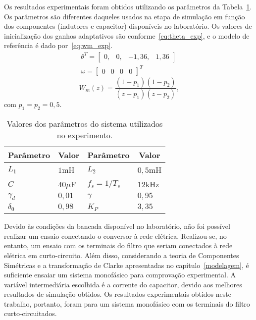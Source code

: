   Os resultados experimentais foram obtidos utilizando os parâmetros da Tabela~\ref{tab:parametros_experimento}. Os parâmetros são diferentes daqueles usados na etapa de simulação em função dos componentes (indutores e capacitor) disponíveis no laboratório. Os valores de inicialização dos ganhos adaptativos são conforme~\ref{eq:theta_exp}, e o modelo de referência é dado por~\ref{eq:wm_exp}.
  \begin{equation}
    \begin{split}
      \theta^T = \left[ \begin{matrix} 0, & 0, & -1,36, & 1,36 \end{matrix} \right]\\
      \omega = {\left[ \begin{matrix} 0 & 0 & 0 & 0 \end{matrix} \right]}^T
    \end{split}
    \label{eq:theta_exp}
  \end{equation}
  \begin{equation}
    W_m(z) = \frac{(1-p_1)(1-p_2)}{(z-p_1)(z-p_2)}\text{,}
    \label{eq:wm_exp}
  \end{equation}
  com $p_1 = p_2 = 0,5$.

  \begin{table}[htb]
    \renewcommand{\arraystretch}{1.35}
    \setlength{\tabcolsep}{1.2mm}
    \caption{Valores dos parâmetros do sistema utilizados no experimento.}
    \label{tab:parametros_experimento}
    \centering
    \begin{tabular}{l l l l}
      \hline
      \multicolumn{1}{c}{Parâmetro} & \multicolumn{1}{c}{Valor} &
      \multicolumn{1}{c}{Parâmetro} & \multicolumn{1}{c}{Valor} \\
      \hline
      $L_1$      & $1$mH    & $L_2$         & $0,5$mH \\
      $C$        & $40\mu$F & $f_s = 1/T_s$ & $12$kHz \\
      $\gamma_d$ & $0,01$   & $\gamma$      & $0,95$  \\
      $\delta_0$ & $0,98$   & $K_P$         & $3,35$  \\
      \hline
    \end{tabular}
  \end{table}

  Devido às condições da bancada disponível no laboratório, não foi possível realizar um ensaio conectando o conversor à rede elétrica. Realizou-se, no entanto, um ensaio com os terminais do filtro que seriam conectados à rede elétrica em curto-circuito. Além disso, considerando a teoria de Componentes Simétricas e a transformação de Clarke apresentadas no capítulo~\ref{modelagem}, é suficiente ensaiar um sistema monofásico para comprovação experimental. A variável intermediária escolhida é a corrente do capacitor, devido aos melhores resultados de simulação obtidos. Os resultados experimentais obtidos neste trabalho, portanto, foram para um sistema monofásico com os terminais do filtro curto-circuitados.

